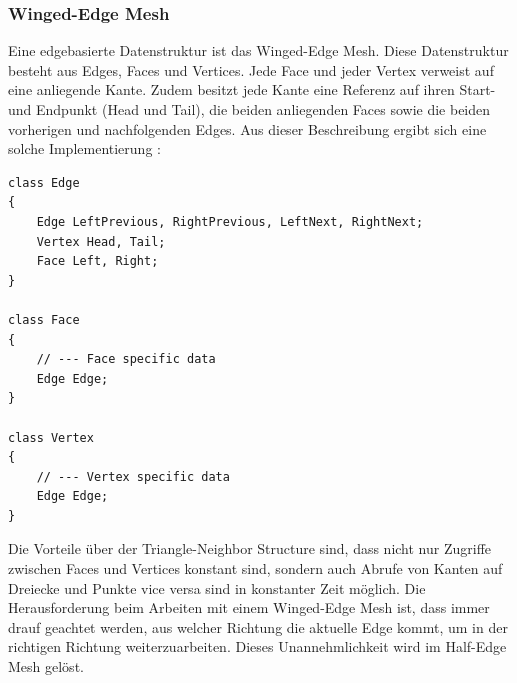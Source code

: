 \subsubsection{Winged-Edge Mesh}
Eine edgebasierte Datenstruktur ist das Winged-Edge Mesh. Diese Datenstruktur besteht aus Edges, Faces und Vertices. Jede Face und jeder Vertex verweist auf eine anliegende Kante. Zudem besitzt jede Kante eine Referenz auf ihren Start- und Endpunkt (Head und Tail), die beiden anliegenden Faces sowie die beiden vorherigen und nachfolgenden Edges. Aus dieser Beschreibung ergibt sich eine solche Implementierung \cite[S.273]{Shirley2010}:

\begin{lstlisting}
class Edge
{
	Edge LeftPrevious, RightPrevious, LeftNext, RightNext;
	Vertex Head, Tail;
	Face Left, Right;
}

class Face 
{
	// --- Face specific data
	Edge Edge;
}

class Vertex 
{
	// --- Vertex specific data
	Edge Edge;
}
\end{lstlisting}

Die Vorteile \"uber der Triangle-Neighbor Structure sind, dass nicht nur Zugriffe zwischen Faces und Vertices konstant sind, sondern auch Abrufe von Kanten auf Dreiecke und Punkte vice versa sind in konstanter Zeit m\"oglich. Die Herausforderung beim Arbeiten mit einem Winged-Edge Mesh ist, dass immer drauf geachtet werden, aus welcher Richtung die aktuelle Edge kommt, um in der richtigen Richtung weiterzuarbeiten. Dieses Unannehmlichkeit wird im Half-Edge Mesh gel\"ost.